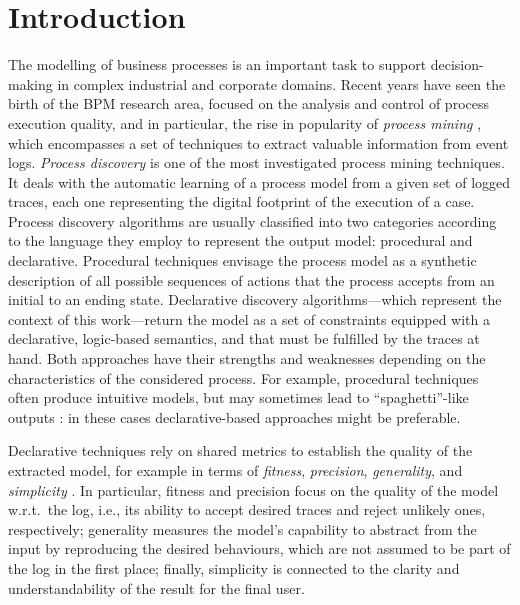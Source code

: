 \documentclass[a4wide,11pt]{article}
\theoremstyle{definition}
\theoremstyle{plain}
\begin{document}
\section{Introduction}\label{sec:intro}
The modelling of business processes is an important task to support decision-making in complex industrial and corporate domains. Recent years have seen the birth of the \ac{BPM} research area, focused on the analysis and control of process execution quality, and in particular, the rise in popularity of \emph{process mining} \cite{2012-Aalst}, which encompasses a set of techniques to extract valuable information from event logs. 
%
\emph{Process discovery} is one of the most investigated process mining techniques. It deals with the automatic learning of a process model from a given set of logged traces, each one representing the digital footprint of the execution of a case. 
Process discovery algorithms are usually classified into two categories according to the language they employ to represent the output model: procedural and declarative.
Procedural techniques envisage the process model as a synthetic description of all possible sequences of actions that the process accepts from an initial to an ending state. Declarative discovery algorithms---which represent the context of this work---return the model as a set of constraints equipped with a declarative, logic-based semantics, and that must be fulfilled by the traces at hand. 
%
Both approaches have their strengths and weaknesses depending on the characteristics of the considered process. For example, procedural techniques often produce  intuitive models, but may sometimes lead to ``spaghetti''-like outputs \cite{2009-Fahland, 2018b-Maggi}: in these cases declarative-based approaches might be preferable.

Declarative techniques rely on shared metrics to establish the quality of the extracted model, for example in terms of \emph{fitness}, \emph{precision}, \emph{generality}, and \emph{simplicity} \cite{2015-Adriansyah,2014-Broucke,2018-Ponce}. In particular, fitness and precision focus on the quality of the model w.r.t.~the log, i.e., its ability to accept desired traces and reject unlikely ones, respectively; generality measures the model's capability to abstract from the input by reproducing the desired behaviours, which are not assumed to be part of the log in the first place; finally, simplicity is connected to the clarity and understandability of the result for the final user. 
\end{document}
